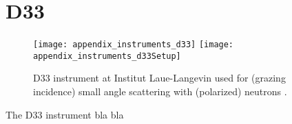 \documentclass[\main/dresen_thesis.tex]{subfiles}
\begin{document}
\section{D33}\label{ch:appendix:lss:d33}
\begin{figure}[h]
  \centering
  \texttt{[image: appendix\_instruments\_d33]}
  \texttt{[image: appendix\_instruments\_d33Setup]}
  \caption{\label{fig:appendix:lss:d33}D33 instrument at Institut Laue-Langevin used for (grazing incidence) small angle scattering with (polarized) neutrons \cite{Dewhurst_2015_Thesm}.}
\end{figure}
The D33 instrument bla bla
\end{document}
